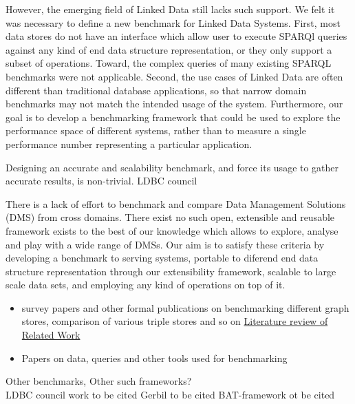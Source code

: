 \documentclass{llncs}
\begin{document}
    
    
    
    
    
    
    
    However, the emerging field of Linked Data still lacks such support.
    We felt it was necessary to define a new benchmark for Linked Data Systems.
    First, most data stores do not have an interface which allow user to execute SPARQl queries against any kind of end data structure representation, or they only support a subset of operations.
    Toward, the complex queries of many existing SPARQL benchmarks were not applicable.
    Second, the use cases of Linked Data are often different than traditional database applications, so that narrow domain benchmarks may not match the intended usage of the system.
    Furthermore, our goal is to develop a benchmarking framework that could be used to explore the performance space of different systems, rather than to measure a single performance number representing a particular application.
    
    Designing an accurate and scalability benchmark, and force its usage to gather accurate results, is non-trivial. LDBC council \cite{DBLP:journals/sigmod/AnglesBLF0ENMKT14}
    
  There is a lack of effort to benchmark and compare Data Management Solutions (DMS) from cross domains. There exist no such open, extensible and reusable framework exists to the best of our knowledge which allows to explore, analyse and play with a wide range of DMSs.
  Our aim is to satisfy these criteria by developing a benchmark to serving systems, portable to diferend end data structure representation through our extensibility framework, scalable to large scale data sets, and employing any kind of operations on top of it.


    \begin{itemize}
        \item survey papers and other formal publications on benchmarking different graph stores, comparison of various triple stores and so on
        \href{https://docs.google.com/document/d/1DbtHvE4oaSuusPjeM2nGNBzrRArQt_rlCh3J5g2aIAE/edit?usp=sharing}{Literature review of Related Work}
        
        \item Papers on data, queries and other tools used for benchmarking
    \end{itemize}
    
    
    Other benchmarks, Other such frameworks? \\
    LDBC council work to be cited
    Gerbil to be cited
    BAT-framework ot be cited \\
\end{document}
